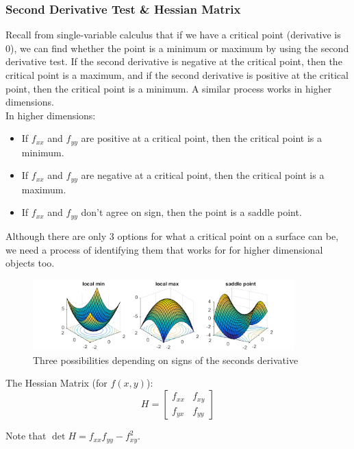 \subsubsection{Second Derivative Test \& Hessian Matrix}
\noindent
Recall from single-variable calculus that if we have a critical point (derivative is 0), we can find whether the point is a minimum or maximum by using the second derivative test.
If the second derivative is negative at the critical point, then the critical point is a maximum, and if the second derivative is positive at the critical point, then the critical point is a minimum.
A similar process works in higher dimensions.\\

\noindent
In higher dimensions:
\begin{itemize}
	\item If $f_{xx}$ and $f_{yy}$ are positive at a critical point, then the critical point is a minimum.
	\item If $f_{xx}$ and $f_{yy}$ are negative at a critical point, then the critical point is a maximum.
	\item If $f_{xx}$ and $f_{yy}$ don't agree on sign, then the point is a saddle point.
\end{itemize}

\noindent
Although there are only 3 options for what a critical point on a surface can be, we need a process of identifying them that works for for higher dimensional objects too.

\begin{figure}[H]
	\centering
	\includegraphics*[width=0.9\textwidth]{./differentialMultivariableCalculus/second_derivative_test.png}
	\caption{Three possibilities depending on signs of the seconds derivative}
\end{figure}

\begin{definition}
	The Hessian Matrix (for $f(x,y)$):
	\begin{equation*}
		H = \begin{bmatrix}
			f_{xx} & f_{xy} \\
			f_{yx} & f_{yy} 
		\end{bmatrix}
	\end{equation*} 
\end{definition}
\noindent
Note that $\det{H} = f_{xx}f_{yy} - f_{xy}^2$.\\


